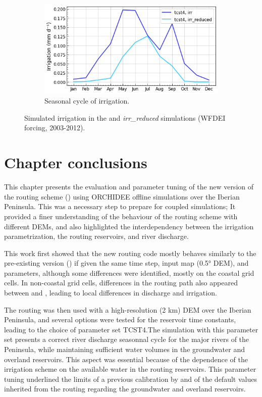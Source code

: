 \begin{figure}[htbp]
    \begin{subfigure}[b]{0.5\textwidth}        
        \caption{Seasonal cycle of irrigation.} 
        \includegraphics[width=\textwidth]{images/chap3/time_series/irrigation_seasonal_cycle_irr_reduced.png}
    \end{subfigure}
    \caption{Simulated irrigation in the \irr and \textit{irr\_reduced} simulations (WFDEI forcing, 2003-2012).}
    \label{fig:merit_irr_reduced}
\end{figure}

\pagebreak

\section{Chapter conclusions}

This chapter presents the evaluation and parameter tuning of the new version of the routing scheme (\native) using ORCHIDEE offline simulations over the Iberian Peninsula. This was a necessary step to prepare for coupled simulations; It provided a finer understanding of the behaviour of the routing scheme with different DEMs, and also highlighted the interdependency between the irrigation parametrization, the routing reservoirs, and river discharge. 

This work first showed that the new routing code mostly behaves similarly to the pre-existing version (\std) if given the same time step, input map (0.5° DEM), and parameters, although some differences were identified, mostly on the coastal grid cells. In non-coastal grid cells, differences in the routing path also appeared between \std and \native, leading to local differences in discharge and irrigation.

The \native routing was then used with a high-resolution (2 km) DEM over the Iberian Peninsula, and several options were tested for the reservoir time constants, leading to the choice of parameter set TCST4.The simulation with this parameter set presents a correct river discharge seasonnal cycle for the major rivers of the Peninsula, while maintaining sufficient water volumes in the groundwater and overland reservoirs. 
This aspect was essential because of the dependence of the irrigation scheme on the available water in the routing reservoirs.
This parameter tuning underlined the limits of a previous calibration by \citet{kilic_evaluation_2023} and of the default values inherited from the \std routing regarding the groundwater and overland reservoirs.

